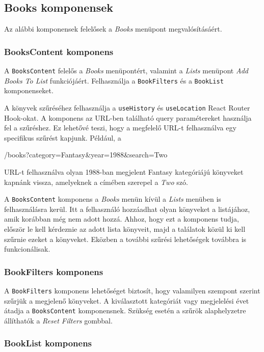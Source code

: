 \subsection{Books komponensek}

Az alábbi komponensek felelősek a \textit{Books} menüpont megvalósításáért.

\subsubsection{BooksContent komponens}

A \texttt{BooksContent} felelős a \textit{Books} menüpontért, valamint a \textit{Lists} menüpont \textit{Add Books To List} funkciójáért. Felhasználja a \texttt{BookFilters} és a \texttt{BookList} komponenseket.

A könyvek szűréséhez felhasználja a \texttt{useHistory} és \texttt{useLocation} React Router Hook-okat. A komponens az URL-ben található query paramétereket használja fel a szűréshez. Ez lehetővé teszi, hogy a megfelelő URL-t felhasználva egy specifikus szűrést kapjunk. Például, a
\begin{java}
/books?category=Fantasy&year=1988&search=Two
\end{java}
URL-t felhasználva olyan 1988-ban megjelent Fantasy kategóriájú könyveket kapnánk vissza, amelyeknek a címében szerepel a \textit{Two} szó.

A \texttt{BooksContent} komponens a \textit{Books} menün kívül a \textit{Lists} menüben is felhasználásra kerül. Itt a felhasználó hozzáadhat olyan könyveket a listájához, amik korábban még nem adott hozzá. Ahhoz, hogy ezt a komponens tudja, először le kell kérdeznie az adott lista könyveit, majd a találatok közül ki kell szűrnie ezeket a könyveket. Eközben a további szűrési lehetőségek továbbra is funkcionálisak.

\subsubsection{BookFilters komponens}

A \texttt{BookFilters} komponens lehetőséget biztosít, hogy valamilyen szempont szerint szűrjük a megjelenő könyveket. A kiválasztott kategóriát vagy megjelelési évet átadja a \texttt{BooksContent} komponensnek. Szükség esetén a szűrök alaphelyzetre állíthatók a \textit{Reset Filters} gombbal.

\subsubsection{BookList komponens}

